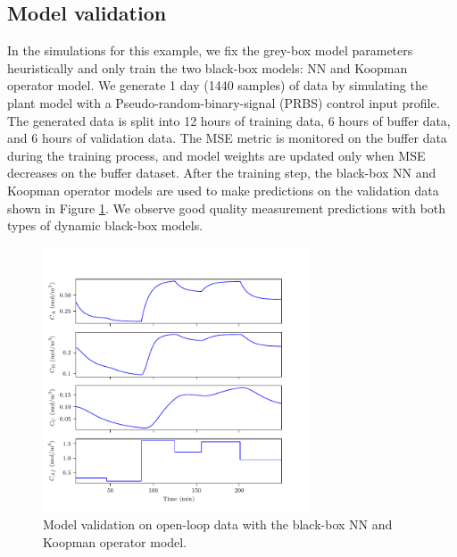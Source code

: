 \documentclass[10pt]{article}
\begin{document}
\subsection{Model validation}
In the simulations for this example, we fix the grey-box model parameters heuristically and only train the two black-box models: NN and Koopman operator model. We generate 1 day (1440 samples) of data by simulating the plant model with a Pseudo-random-binary-signal (PRBS) control input profile. The generated data is split into 12 hours of training data, 6 hours of buffer data, and 6 hours of validation data. The MSE metric is monitored on the buffer data during the training process, and model weights are updated only when MSE decreases on the buffer dataset. After the training step, the black-box NN and Koopman operator models are used to make predictions on the validation data shown in Figure \ref{fig:tworeac_validation}. We observe good quality measurement predictions with both types of dynamic black-box models.

\begin{figure}[!h]
  \centering
  \includegraphics[page=1, height=0.5\textheight, 
                   width=0.7\textwidth]{tworeac_plots.pdf}
  \caption{Model validation on open-loop data with the black-box NN and Koopman operator model.}
  \label{fig:tworeac_validation}
\end{figure}
\end{document}
